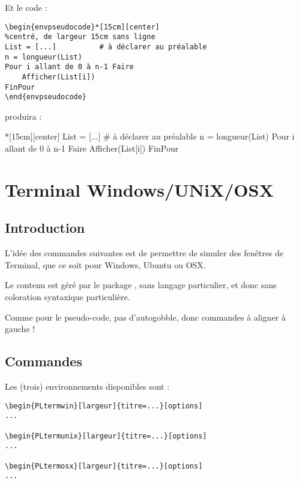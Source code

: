 \documentclass{article}
\newcommand\ctex[1]{\tcbox[vignettelatex]{#1}}
\begin{document}
\medskip

Et le code :

\begin{verbatim}
\begin{envpseudocode}*[15cm][center]
%centré, de largeur 15cm sans ligne
List = [...]          # à déclarer au préalable
n = longueur(List)
Pour i allant de 0 à n-1 Faire
	Afficher(List[i])
FinPour
\end{envpseudocode}
\end{verbatim}

produira :

\begin{envpseudocode}*[15cm][center]
List = [...]          # à déclarer au préalable
n = longueur(List)
Pour i allant de 0 à n-1 Faire
	Afficher(List[i])
FinPour
\end{envpseudocode}

\newpage

\section{Terminal Windows/UNiX/OSX}

\subsection{Introduction}

L'idée des \textsf{commandes} suivantes est de permettre de simuler des fenêtres de \textsf{Terminal}, que ce soit pour Windows, Ubuntu ou OSX.

\smallskip

Le \textsf{contenu} est géré par le package \ctex{listings}, sans langage particulier, et donc sans coloration syntaxique particulière.

\smallskip

Comme pour le pseudo-code, pas d'\textsf{autogobble}, donc commandes à aligner à gauche !

\subsection{Commandes}

Les (trois) environnements disponibles sont :

\begin{verbatim}
\begin{PLtermwin}[largeur]{titre=...}[options]
...

\begin{PLtermunix}[largeur]{titre=...}[options]
...

\begin{PLtermosx}[largeur]{titre=...}[options]
...
\end{verbatim}
\end{document}

